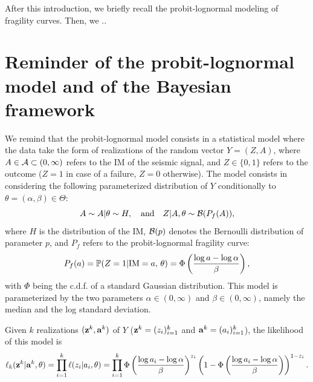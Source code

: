 After this introduction, we briefly recall the probit-lognormal modeling of %
fragility curves. Then, we ..


\section{Reminder of the probit-lognormal model and of the Bayesian framework}


We remind that the probit-lognormal model consists in a statistical model where the data take the form of realizations of the random vector $Y=(Z,A)$, where $A\in\mathcal{A}\subset(0,\infty)$ refers to the IM of the seismic signal, and $Z\in\{0,1\}$ refers to the outcome ($Z=1$ in case of a failure, $Z=0$ otherwise). The model consists in considering
the following parameterized distribution of $Y$ conditionally to $\theta=(\alpha,\beta)\in\Theta$:
    \begin{equation}
        A\sim A|\theta\sim H,\quad\text{and}\quad Z|A,\theta\sim\mathcal{B}(P_f(A)),
    \end{equation}
where $H$ is the distribution of the IM, $\mathcal{B}(p)$ denotes the Bernoulli distribution of parameter $p$, and $P_f$ refers to the probit-lognormal fragility curve:
\begin{equation}
    P_f(a) = \mathbb{P}(Z=1|\text{IM}=a,\,\theta) = \Phi\left(\frac{\log a-\log\alpha}{\beta}\right),
\end{equation}
with $\Phi$ being the c.d.f. of a standard Gaussian distribution. This model is parameterized by the two parameters $\alpha\in(0,\infty)$ and $\beta\in(0,\infty)$, namely the median and the log standard deviation. 

Given $k$ realizations $(\mathbf{z}^k,\mathbf{a}^k)$ of $Y$ ($\mathbf{z}^k=(z_i)_{i=1}^k$ and $\mathbf{a}^k=(a_i)_{i=1}^k$), the likelihood of this model is
\begin{equation}\label{eq:constr-frag:likelihood}
    \ell_k(\mathbf{z}^k|\mathbf{a}^k,\theta) = \prod_{i=1}^k\ell(z_i|a_i,\theta) = \prod_{i=1}^k\Phi\left(\frac{\log a_i-\log\alpha}{\beta}\right)^{z_i}\left(1-\Phi\left(\frac{\log a_i-\log\alpha}{\beta}\right)\right)^{1-z_i}.
\end{equation}






